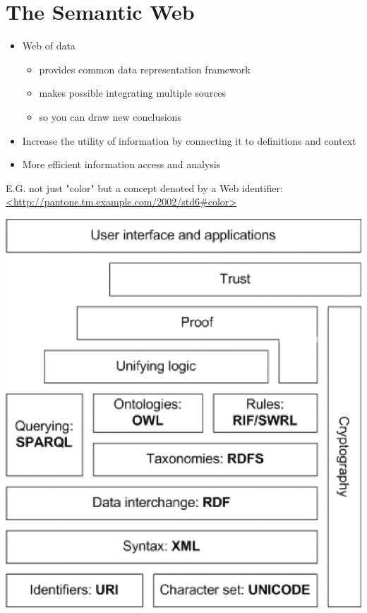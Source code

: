 \documentclass[a4paper,landscape,headrule,footrule,xetex]{foils}
\begin{document}
\section{The Semantic Web}
\begin{itemize} 
\item Web of data
  \begin{itemize}
  \item provides common data representation framework
  \item makes possible integrating multiple sources
  \item so you can draw new conclusions
  \end{itemize}
\item  Increase the utility of information by connecting it to definitions and context
\item  More efficient information access and analysis
\end{itemize}

E.G. not just "color" but a concept denoted by a Web identifier: 
\\ \url{<http://pantone.tm.example.com/2002/std6#color>}


\includegraphics[height=\textheight]{../pics/semantic-web-layers.eps}
\end{document}
